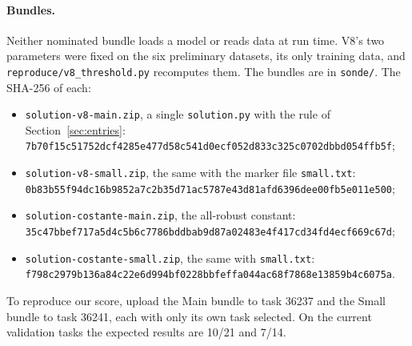 \paragraph{Bundles.} Neither nominated bundle loads a model or reads data at run time. V8's two parameters were fixed on the six preliminary datasets, its only training data, and \texttt{reproduce/v8\_threshold.py} recomputes them. The bundles are in \texttt{sonde/}. The SHA-256 of each:
\begin{itemize}
\item \texttt{solution-v8-main.zip}, a single \texttt{solution.py} with the rule of Section~\ref{sec:entries}: {\footnotesize\texttt{7b70f15c51752dcf4285e477d58c541d0ecf052d833c325c0702dbbd054ffb5f}};
\item \texttt{solution-v8-small.zip}, the same with the marker file \texttt{small.txt}: {\footnotesize\texttt{0b83b55f94dc16b9852a7c2b35d71ac5787e43d81afd6396dee00fb5e011e500}};
\item \texttt{solution-costante-main.zip}, the all-robust constant: {\footnotesize\texttt{35c47bbef717a5d4c5b6c7786bddbab9d87a02483e4f417cd34fd4ecf669c67d}};
\item \texttt{solution-costante-small.zip}, the same with \texttt{small.txt}: {\footnotesize\texttt{f798c2979b136a84c22e6d994bf0228bbfeffa044ac68f7868e13859b4c6075a}}.
\end{itemize}
To reproduce our score, upload the Main bundle to task 36237 and the Small bundle to task 36241, each with only its own task selected. On the current validation tasks the expected results are 10/21 and 7/14.
